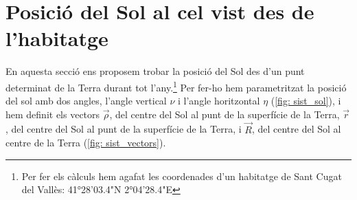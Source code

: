 \documentclass[11pt]{article}
\begin{document}
\section{Posició del Sol al cel vist des de l'habitatge} \label{sec: seccio_2}
En aquesta secció ens proposem trobar la posició del Sol des d'un punt determinat de la Terra durant tot l'any.\footnote{\label{nota: habitatge}Per fer els càlculs hem agafat les coordenades d'un habitatge de Sant Cugat del Vallès: 41°28'03.4"N 2°04'28.4"E} Per fer-ho hem parametritzat la posició del sol amb dos angles, l'angle vertical $\nu$ i l'angle horitzontal $\eta$ (\ref{fig: sist_sol}), i hem definit els vectors $\vec{\rho}$, del centre del Sol al punt de la superfície de la Terra, $\vec{r}$, del centre del Sol al punt de la superfície de la Terra, i $\vec{R}$, del centre del Sol al centre de la Terra (\ref{fig: sist_vectors}).
\end{document}

